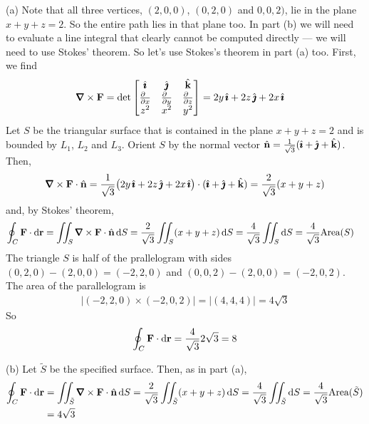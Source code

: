 \begin{solution}
(a) Note that all three vertices, $(2,0,0)$, $(0,2,0)$ and $0,0,2)$, lie in the
plane $x+y+z=2$. So the entire path lies in that plane too. 
In part (b)
we will need to evaluate a line integral that clearly cannot be computed
directly --- we will need to use Stokes' theorem. So let's use
Stokes's theorem in part (a) too. First, we find
\begin{align*}
\vnabla\times\vF
&=\det\left[\begin{matrix}
\hi &\hj &\hk \\
\tfrac{\partial\hfill}{\partial x} & \tfrac{\partial\hfill}{\partial y} & 
                \tfrac{\partial\hfill}{\partial z} \\
z^2 & x^2 & y^2
\end{matrix}
\right]
=2y\,\hi + 2z\,\hj + 2x\,\hi
\end{align*}
Let $S$ be the triangular surface that is contained in the plane 
$x+y+z=2$ and is bounded by $L_1$, $L_2$ and $L_3$. Orient $S$ by the normal vector $\hat{\mathbf{n}} = \frac{1}{\sqrt{3}}(\hat{\pmb{\imath}}+\hat{\pmb{\jmath}}+\hat{\mathbf{k}})$. Then, 
\begin{equation*}
\vnabla\times\vF\cdot\hn
=\frac{1}{\sqrt{3}}\big(2y\,\hi + 2z\,\hj + 2x\,\hi\big)\cdot(\hi+\hj+\hk)
=\frac{2}{\sqrt{3}}(x+y+z)
\end{equation*}
and, by Stokes' theorem,
\begin{align*}
\oint_C\vF\cdot \dee{\vr}
&=\dblInt_S\vnabla\times\vF\cdot\hn\,\dee{S}
=\frac{2}{\sqrt{3}}\dblInt_S(x+y+z)\,\dee{S}
=\frac{4}{\sqrt{3}}\dblInt_S\dee{S}
=\frac{4}{\sqrt{3}}\text{Area}(S)
\end{align*}
The triangle $S$ is half of the prallelogram with sides $(0,2,0)-(2,0,0)
=(-2,2,0)$ and $(0,0,2)-(2,0,0)=(-2,0,2)$. The area of the parallelogram
is
\begin{align*}
\big|(-2,2,0)\times (-2,0,2)\big|
=\big|(4,4,4)\big|
=4\sqrt{3}
\end{align*}
So
\begin{align*}
\oint_C\mathbf{F}\cdot \mathrm{d}\mathbf{r} = \frac{4}{\sqrt{3}} 2\sqrt{3}
=8
\end{align*}

\noindent (b)
Let $\tilde S$ be the specified surface. Then, as in part (a), 
\begin{align*}
\oint_C\vF\cdot \dee{\vr}
&=\dblInt_{\tilde S}\vnabla\times\vF\cdot\hn\,\dee{S}
=\frac{2}{\sqrt{3}}\dblInt_{\tilde S}(x+y+z)\,\dee{S}
=\frac{4}{\sqrt{3}}\dblInt_{\tilde S}\dee{S}
=\frac{4}{\sqrt{3}}\text{Area}(\tilde S) \\
&=4\sqrt{3}
\end{align*}
\end{solution}

